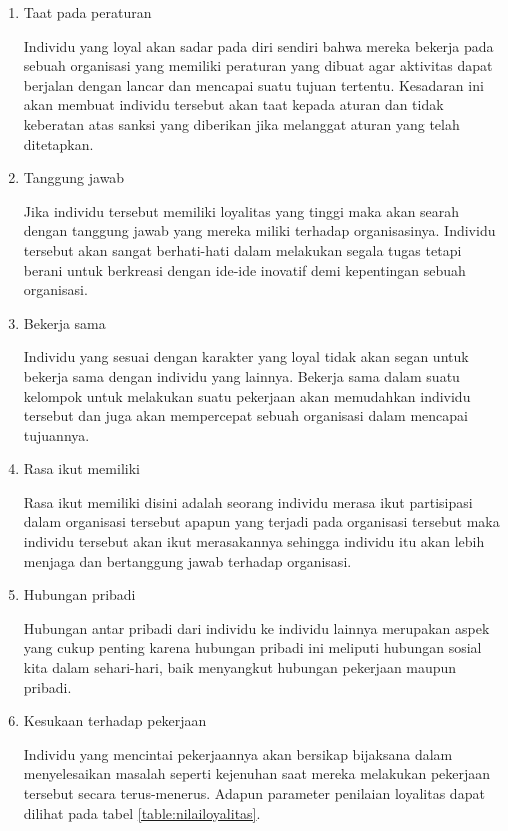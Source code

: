 \begin{enumerate}
\item Taat pada peraturan \par
Individu yang loyal akan sadar pada diri sendiri bahwa mereka bekerja pada sebuah organisasi yang memiliki peraturan yang dibuat agar aktivitas dapat berjalan dengan lancar dan mencapai suatu tujuan tertentu. Kesadaran ini akan membuat individu tersebut akan taat kepada aturan dan tidak keberatan atas sanksi yang diberikan jika melanggat aturan yang telah ditetapkan.

\item Tanggung jawab \par
Jika individu tersebut memiliki loyalitas yang tinggi maka akan searah dengan tanggung jawab yang mereka miliki terhadap organisasinya. Individu tersebut akan sangat berhati-hati dalam melakukan segala tugas tetapi berani untuk berkreasi dengan ide-ide inovatif demi kepentingan sebuah organisasi.

\item Bekerja sama \par
Individu yang sesuai dengan karakter yang loyal tidak akan segan untuk bekerja sama dengan individu yang lainnya. Bekerja sama dalam suatu kelompok untuk melakukan suatu pekerjaan akan memudahkan individu tersebut dan juga akan mempercepat sebuah organisasi dalam mencapai tujuannya.

\item Rasa ikut memiliki \par 
Rasa ikut memiliki disini adalah seorang individu merasa ikut partisipasi dalam organisasi tersebut apapun yang terjadi pada organisasi tersebut maka individu tersebut akan ikut merasakannya sehingga individu itu akan lebih menjaga dan bertanggung jawab terhadap organisasi.

\item Hubungan pribadi \par 
Hubungan antar pribadi dari individu ke individu lainnya merupakan aspek yang cukup penting karena hubungan pribadi ini meliputi hubungan sosial kita dalam sehari-hari, baik menyangkut hubungan pekerjaan maupun pribadi.

\item Kesukaan terhadap pekerjaan \par 
Individu yang mencintai pekerjaannya akan bersikap bijaksana dalam menyelesaikan masalah seperti kejenuhan saat mereka melakukan pekerjaan tersebut secara terus-menerus. Adapun parameter penilaian loyalitas dapat dilihat pada tabel \ref{table:nilailoyalitas}.
\end{enumerate}


